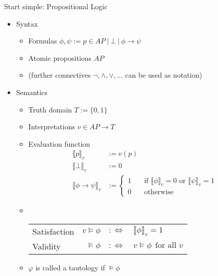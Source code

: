 \begin{frame}{Start simple: Propositional Logic}
\begin{itemize}
	\item Syntax
	\begin{itemize}
		\item Formulas $\phi, \psi := p \in AP~|~ ⊥ ~|~ \phi \rightarrow \psi$
		\item Atomic propositions $AP$
		\item (further connectives $\neg, ∧, ∨, ...$ can be used as notation)
	\end{itemize}

	\pause

	\item Semantics
	\begin{itemize}
		\item Truth domain $T := \{0, 1\}$
		\item Interpretations $v \in AP \rightarrow T$
		\item Evaluation function
		\begin{align*}
		\llbracket p \rrbracket_v &:= v(p)\\
		\llbracket ⊥ \rrbracket_v &:= 0\\
		\llbracket \phi \rightarrow \psi \rrbracket_v &:= \left\{\begin{aligned}
			1 & \quad\text{if $\llbracket \phi \rrbracket_v = 0$ or $\llbracket \psi \rrbracket_v = 1$}\\
			0 & \quad\text{otherwise}
		\end{aligned}\right.
		\end{align*}
		\item~\\[-1em]
		\begin{tabular}{l r @{\qquad}l}
		Satisfaction          & $v \vDash \phi$ & $:\Leftrightarrow \quad \llbracket \phi \rrbracket_v = 1$ \\
		Validity              & $\vDash \phi$   & $:\Leftrightarrow \quad v \vDash \phi ~~\text{for all $v$}$ \\
		\end{tabular}
		\item $φ$ is called a tautology if $\vDash \phi$
	\end{itemize}
\end{itemize}
\end{frame}

